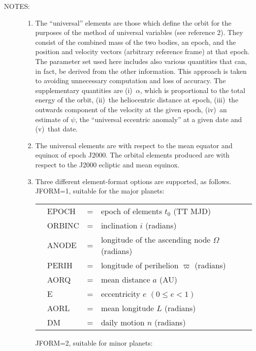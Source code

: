 \documentclass[11pt,twoside,nolof]{starlink}
\newcommand{\notes}[1]
 {
   \begin{description}
     \item[NOTES:]
         #1
   \end{description}
}
\begin{document}
\notes
{
 \begin{enumerate}
  \setlength{\parskip}{\medskipamount}
  \item The ``universal'' elements are those which define the orbit for the
        purposes of the method of universal variables (see reference 2).
        They consist of the combined mass of the two bodies, an epoch,
        and the position and velocity vectors (arbitrary reference frame)
        at that epoch.  The parameter set used here includes also various
        quantities that can, in fact, be derived from the other
        information.  This approach is taken to avoiding unnecessary
        computation and loss of accuracy.  The supplementary quantities
        are (i)~$\alpha$, which is proportional to the total energy of the
        orbit, (ii)~the heliocentric distance at epoch,
        (iii)~the outwards component of the velocity at the given epoch,
        (iv)~an estimate of $\psi$, the ``universal eccentric anomaly'' at a
        given date and (v)~that date.
  \item The universal elements are with respect to the mean equator and
        equinox of epoch J2000.  The orbital elements produced are with
        respect to the J2000 ecliptic and mean equinox.
  \item Three different element-format options are supported, as
        follows. \\

        JFORM=1, suitable for the major planets:

        \begin{tabular}{llll}
        & EPOCH  & = & epoch of elements $t_0$ (TT MJD) \\
        & ORBINC & = & inclination $i$ (radians) \\
        & ANODE  & = & longitude of the ascending node $\Omega$ (radians) \\
        & PERIH  & = & longitude of perihelion $\varpi$ (radians) \\
        & AORQ   & = & mean distance $a$ (AU) \\
        & E      & = & eccentricity $e$ $( 0 \leq e < 1 )$ \\
        & AORL   & = & mean longitude $L$ (radians) \\
        & DM     & = & daily motion $n$ (radians)
        \end{tabular}

        JFORM=2, suitable for minor planets:


\end{enumerate}}
\end{document}
